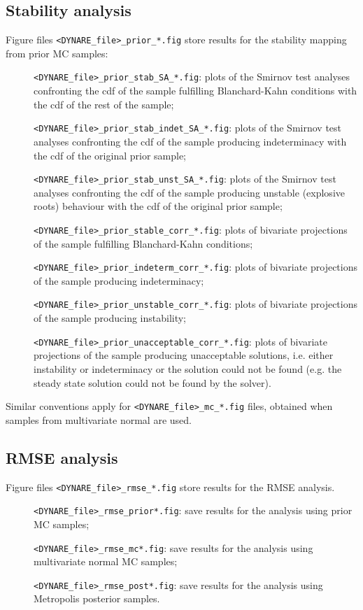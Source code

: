 \documentclass[12pt,a4paper]{article}
\begin{document}
\subsection{Stability analysis}
Figure files \verb"<DYNARE_file>_prior_*.fig" store results for
the stability mapping from prior MC samples:
\begin{description}
\item[]\verb"<DYNARE_file>_prior_stab_SA_*.fig": plots of the Smirnov
test analyses confronting the cdf of the sample fulfilling
Blanchard-Kahn conditions with the cdf of the rest of the sample;
\item[]\verb"<DYNARE_file>_prior_stab_indet_SA_*.fig": plots of the Smirnov
test analyses confronting the cdf of the sample producing
indeterminacy with the cdf of the original prior sample;
\item[]\verb"<DYNARE_file>_prior_stab_unst_SA_*.fig": plots of the Smirnov
test analyses confronting the cdf of the sample producing unstable
(explosive roots) behaviour with the cdf of the original prior
sample;
\item[]\verb"<DYNARE_file>_prior_stable_corr_*.fig": plots of
bivariate projections of the sample fulfilling Blanchard-Kahn
conditions;
\item[]\verb"<DYNARE_file>_prior_indeterm_corr_*.fig": plots of
bivariate projections of the sample producing indeterminacy;
\item[]\verb"<DYNARE_file>_prior_unstable_corr_*.fig":  plots of
bivariate projections of the sample producing instability;
\item[]\verb"<DYNARE_file>_prior_unacceptable_corr_*.fig": plots of
bivariate projections of the sample producing unacceptable
solutions, i.e. either instability or indeterminacy or the
solution could not be found (e.g. the steady state solution could
not be found by the solver).
\end{description}
Similar conventions apply for \verb"<DYNARE_file>_mc_*.fig" files,
obtained when samples from multivariate normal are used.

\subsection{RMSE analysis}
Figure files \verb"<DYNARE_file>_rmse_*.fig" store results for the
RMSE analysis.
\begin{description}
\item[]\verb"<DYNARE_file>_rmse_prior*.fig": save results for
the analysis using prior MC samples;
\item[]\verb"<DYNARE_file>_rmse_mc*.fig": save results for
the analysis using multivariate normal MC samples;
\item[]\verb"<DYNARE_file>_rmse_post*.fig": save results for
the analysis using Metropolis posterior samples.
\end{description}
\end{document}
